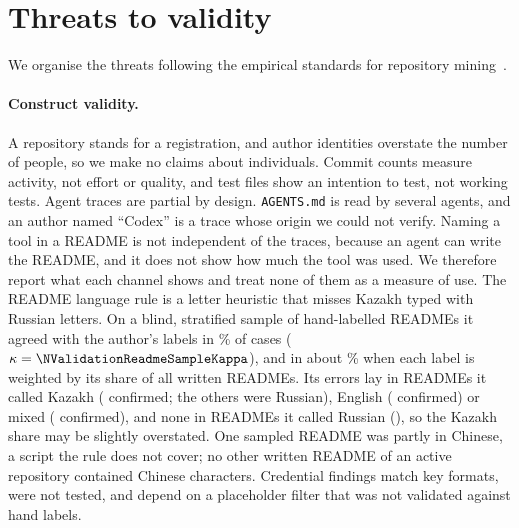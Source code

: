 \documentclass{article}
\begin{document}
\section{Threats to validity}\label{sec:threats}

We organise the threats following the empirical standards for repository mining~\cite{ralph2020standards}.

\paragraph{Construct validity.} A repository stands for a registration, and author identities overstate the number of people, so we make no claims about individuals. Commit counts measure activity, not effort or quality, and test files show an intention to test, not working tests. Agent traces are partial by design. \texttt{AGENTS.md} is read by several agents, and an author named ``Codex'' is a trace whose origin we could not verify. Naming a tool in a README is not independent of the traces, because an agent can write the README, and it does not show how much the tool was used. We therefore report what each channel shows and treat none of them as a measure of use. The README language rule is a letter heuristic that misses Kazakh typed with Russian letters. On a blind, stratified sample of \NValidationReadmeSampleLabelled{} hand-labelled READMEs it agreed with the author's labels in \NValidationReadmeSampleAgreePct\% of cases ($\kappa = \NValidationReadmeSampleKappa$), and in about \NValidationReadmeSampleWeightedAcc\% when each label is weighted by its share of all written READMEs. Its errors lay in READMEs it called Kazakh (\NValidationReadmeSampleAgreeKazakh{} confirmed; the others were Russian), English (\NValidationReadmeSampleAgreeEnglish{} confirmed) or mixed (\NValidationReadmeSampleAgreeMixed{} confirmed), and none in READMEs it called Russian (\NValidationReadmeSampleAgreeRussian), so the Kazakh share may be slightly overstated. One sampled README was partly in Chinese, a script the rule does not cover; no other written README of an active repository contained Chinese characters. Credential findings match key formats, were not tested, and depend on a placeholder filter that was not validated against hand labels.
\end{document}
